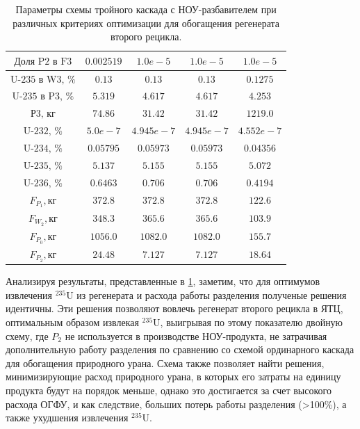 \begin{table}
\begin{tabular}{ccccc}
        $\text{Доля P2 в F3}$ & $0.002519$ & $1.0e-5$ & $1.0e-5$ & $1.0e-5$\\ \hline
        $\text{U-235 в W3, \%}$ & $0.13$ & $0.13$ & $0.13$ & $0.1275$\\ \hline
        $\text{U-235 в P3, \%}$ & $5.319$ & $4.617$ & $4.617$ & $4.253$\\ \hline
        $\text{Р3, кг}$ & $74.86$ & $31.42$ & $31.42$ & $1219.0$\\ \hline
        $\text{U-232, \%}$ & $5.0e-7$ & $4.945e-7$ & $4.945e-7$ & $4.552e-7$\\ \hline
        $\text{U-234, \%}$ & $0.05795$ & $0.05973$ & $0.05973$ & $0.04356$\\ \hline
        $\text{U-235, \%}$ & $5.137$ & $5.155$ & $5.155$ & $5.072$\\ \hline
        $\text{U-236, \%}$ & $0.6463$ & $0.706$ & $0.706$ & $0.4194$\\ \hline
        $F_{P_1}, \text{кг}$ & $372.8$ & $372.8$ & $372.8$ & $122.6$\\ \hline
        $F_{W_2}, \text{кг}$ & $348.3$ & $365.6$ & $365.6$ & $103.9$\\ \hline
        $F_{P_0}, \text{кг}$ & $1056.0$ & $1082.0$ & $1082.0$ & $155.7$\\ \hline
        $F_{P_2}, \text{кг}$ & $24.48$ & $7.127$ & $7.127$ & $18.64$\\ \hline
        \end{tabular}        
\caption{Параметры схемы тройного каскада с НОУ-разбавителем при различных критериях оптимизации для обогащения регенерата второго рецикла.{\label{3opt2}}}
\end{table}

Анализируя результаты, представленные в \ref{3opt2}, заметим, что для оптимумов извлечения  $^{235}$U из регенерата и расхода работы разделения полученые решения идентичны. Эти решения позволяют вовлечь регенерат второго рецикла в ЯТЦ, оптимальным образом извлекая  $^{235}$U, выигрывая по этому показателю двойную схему, где $P_2$ не используется в производстве НОУ-продукта, не затрачивая дополнительную работу разделения по сравнению со схемой ординарного каскада для обогащения природного урана.
Схема также позволяет найти решения, минимизирующие расход природного урана, в которых его затраты на единицу продукта будут на порядок меньше, однако это достигается за счет высокого расхода ОГФУ, и как следствие, больших потерь работы разделения (>100\%), а также ухудшения извлечения  $^{235}$U. 

